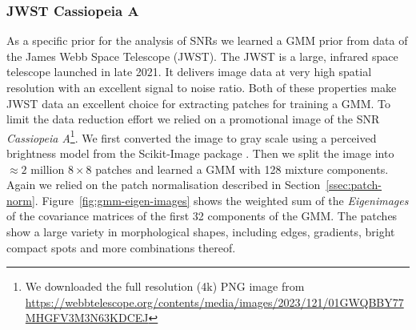 \documentclass[twocolumn]{aastex631}
\newcommand{\todo}[1]{\textcolor{red}{TODO: #1}\PackageWarning{TODO:}{#1!}}
\begin{document}
    \subsubsection{JWST Cassiopeia A}
    As a specific prior for the analysis of SNRs we learned a GMM prior from data of the James Webb Space Telescope (JWST). The JWST is a large, infrared space telescope launched in late 2021. It delivers image data at very high spatial resolution with an excellent signal to noise ratio. Both of these properties make JWST data an excellent choice for extracting patches for training a GMM. To limit the data reduction effort we relied on a promotional image of the SNR \textit{Cassiopeia A}\footnote{We downloaded the full resolution (4k)  PNG image from \url{https://webbtelescope.org/contents/media/images/2023/121/01GWQBBY77MHGFV3M3N63KDCEJ}}. We first converted the image to gray scale using a perceived brightness model from the Scikit-Image package \citep{scikit-image}. Then we split the image into $\approx 2$ million $8\times 8$ patches and learned a GMM with 128 mixture components. Again we relied on the patch normalisation described in Section~\ref{ssec:patch-norm}. Figure~\ref{fig:gmm-eigen-images} shows the weighted sum of the \textit{Eigenimages} of the covariance matrices of the first 32 components of the GMM. The patches show a large variety in morphological shapes, including edges, gradients, bright compact spots and more combinations thereof.

    

\end{document}
